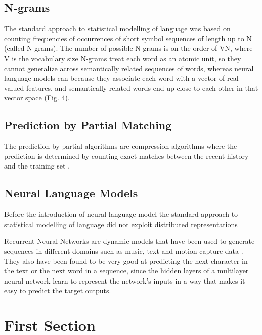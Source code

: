 \subsection{N-grams}
The standard approach to statistical modelling of language was based on counting frequencies of occurrences of short symbol sequences of length up to N (called N-grams). The number of possible N-grams is on the order of VN, where V is the vocabulary size N-grams treat each word as an atomic unit, so they cannot generalize across semantically related sequences of words, whereas neural language models can because they associate each word with a vector of real valued features, and semantically related words end up close to each other in that vector space (Fig. 4).\cite{lecun2015deep}

\subsection{Prediction by Partial Matching}
The prediction by partial algorithms are compression algorithms where the prediction is determined by counting exact matches between the recent history and the training set \cite{graves2013generating}.
    
\subsection{Neural Language Models}
Before the introduction of neural language model the standard approach to statistical modelling of language did not exploit distributed representations\cite{lecun2015deep}

Recurrent Neural Networks are dynamic models that have been used to generate sequences in different domains such as music, text and motion capture data \cite{graves2013generating}.
They also have been found to be very good at predicting the next character in the text or the next word in a sequence, since the hidden layers of a multilayer neural network learn to represent the network’s inputs in a way that makes it easy to predict the target outputs.\cite{lecun2015deep}

\section{First Section}